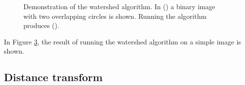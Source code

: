 \documentclass[
  digital,     %
  oneside,     %
  nosansbold,  %
  nocolorbold, %
  lof,         %
  lot,         %
]{fithesis4}
\begin{document}
\begin{figure}
    \begin{subfigure}[t]{0.48\textwidth}
        \caption{}
        \label{fig:demo-watershed-orig}
    \end{subfigure}
    \begin{subfigure}[t]{0.48\textwidth}
        \caption{}
        \label{fig:demo-watershed-run}
    \end{subfigure}
    \caption{Demonstration of the watershed algorithm. In () a binary image with two overlapping circles is shown. Running the algorithm produces ().}
    \label{fig:demo-watershed}
\end{figure}

In Figure \ref{fig:demo-watershed}, the result of running the watershed algorithm 
on a simple image is shown.

\subsection{Distance transform}
\end{document}
